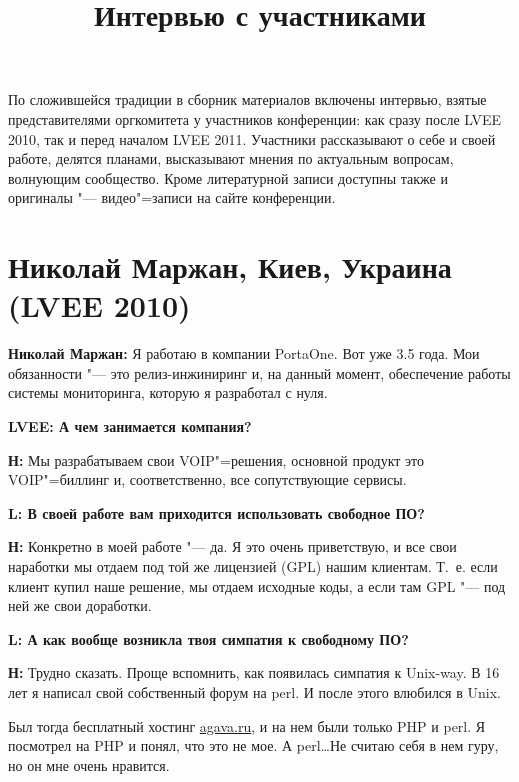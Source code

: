 \documentclass[10pt, a5paper]{article}
\begin{document}
\title{Интервью с участниками}
\date{}
\maketitle

По сложившейся традиции в сборник материалов включены интервью, взятые представителями оргкомитета у участников конференции: как сразу после LVEE 2010, так и перед началом LVEE 2011. Участники рассказывают о себе и своей работе, делятся планами, высказывают мнения по актуальным вопросам, волнующим сообщество. Кроме литературной записи доступны также и оригиналы "--- видео"=записи на сайте конференции.

\section{Николай Маржан, Киев, Украина (LVEE 2010)}

{\noindent \bf Николай Маржан:} Я работаю в компании PortaOne. Вот уже 3.5 года. Мои обязанности "--- это релиз-инжиниринг и, на данный момент, обеспечение работы системы мониторинга, которую я разработал с нуля.

{\noindent \bf LVEE: А чем занимается компания?}

{\noindent \bf Н:} Мы разрабатываем свои VOIP"=решения, основной продукт это VOIP"=биллинг и, соответственно, все сопутствующие сервисы.

{\noindent \bf L: В своей работе вам приходится использовать свободное ПО?}

{\noindent \bf Н:} Конкретно в моей работе "--- да. Я это очень приветствую, и все свои наработки мы отдаем под той же лицензией (GPL) нашим клиентам. Т.~е. если клиент купил наше решение, мы отдаем исходные коды, а если там GPL "--- под ней же свои доработки.

{\noindent \bf L: А как вообще возникла твоя симпатия к свободному ПО?}

{\noindent \bf Н:} Трудно сказать. Проще вспомнить, как появилась симпатия к Unix-way. В 16 лет я написал свой собственный форум на perl. И после этого влюбился в Unix. 

Был тогда бесплатный хостинг \url{agava.ru}, и на нем были только PHP и perl. Я посмотрел на PHP и понял, что это не мое. А perl\ldots Не считаю себя в нем гуру, но он мне очень нравится. 
\end{document}
